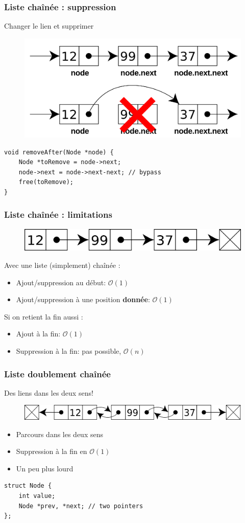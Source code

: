\documentclass[12pt]{beamer}
\newcommand{\bigoh}[1]{\mathcal{O}\left(#1\right)}
\newcommand{\constant}{\bigoh{1}}
\newcommand{\linear}{\bigoh{n}}
\begin{document}
\begin{frame}[fragile]
\frametitle{Liste chaînée : suppression}
Changer le lien et supprimer
\begin{figure}
\centering
\includegraphics[width=.6\textwidth]{img/remove-node}
\end{figure}
\begin{lstlisting}
void removeAfter(Node *node) {
    Node *toRemove = node->next;
    node->next = node->next-next; // bypass
    free(toRemove);
}
\end{lstlisting}
\end{frame}

\begin{frame}[fragile]
\frametitle{Liste chaînée : limitations}
\begin{figure}
\centering
\includegraphics[width=.8\textwidth]{img/singly-linked}
\end{figure}
Avec une liste (simplement) chaînée :
\begin{itemize}
\item Ajout/suppression au début: $\constant$
\item Ajout/suppression à une position \textbf{donnée}: $\constant$
\end{itemize}
Si on retient la fin aussi :
\begin{itemize}
\item Ajout à la fin: $\constant$
\item Suppression à la fin: pas possible, $\linear$
\end{itemize}
\end{frame}

\begin{frame}[fragile]
\frametitle{Liste doublement chaînée}
Des liens dans les deux sens!
\begin{figure}
\centering
\includegraphics[width=.8\textwidth]{img/doubly-linked}
\end{figure}
\begin{itemize}
\item Parcours dans les deux sens
\item Suppression à la fin en $\constant$
\item Un peu plus lourd
\end{itemize}
\begin{lstlisting}
struct Node {
    int value;
    Node *prev, *next; // two pointers
};
\end{lstlisting}
\end{frame}
\end{document}

